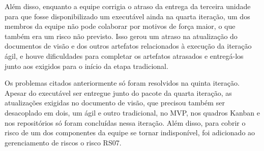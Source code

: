 \documentclass[
	12pt,				%
	oneside,			%
	a4paper,			%
	english,			%
	brazil,				%
	]{abntex2}
\begin{document}
Além disso, enquanto a equipe corrigia o atraso da entrega da terceira unidade para que fosse disponibilizado um executável ainda na quarta iteração, um dos membros da equipe não pode colaborar por motivos de força maior, o que também era um risco não previsto. Isso gerou um atraso na atualização do documentos de visão e dos outros artefatos relacionados à execução da iteração ágil, e houve dificuldades para completar os artefatos atrasados e entregá-los junto aos exigidos para o início da etapa tradicional.

Os problemas citados anteriormente só foram resolvidos na quinta iteração. Apesar do executável ser entregue junto do pacote da quarta iteração, as atualizações exigidas no documento de visão, que precisou também ser desacoplado em dois, um ágil e outro tradicional, no MVP, nos quadros Kanban e nos repositórios só foram concluídas nessa iteração. Além disso, para cobrir o risco de um dos componentes da equipe se tornar indisponível, foi adicionado ao gerenciamento de riscos o risco RS07.




\end{document}
